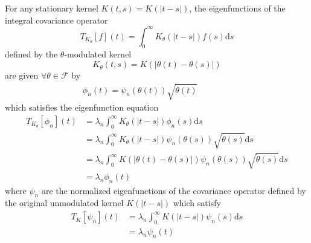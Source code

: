 \documentclass{mc}
\newcommand{\mathd}{\mathrm{d}}
\begin{document}
\begin{theorem}[Eigenfunctions]
  For any stationary kernel $K (t, s) = K (|t - s|)$, the eigenfunctions of
  the integral covariance operator
  \begin{equation}
    T_{K_{\theta}}  [f] (t) = \int_0^{\infty} K_{\theta} (| t - s |) f (s)
    \mathd s
  \end{equation}
  defined by the $\theta$-modulated kernel
  \begin{equation}
    K_{\theta} (t, s) = K (| \theta (t) - \theta (s) |)
  \end{equation}
  are given $\forall \theta \in \mathcal{F}$ by
  \begin{equation}
    \begin{array}{llllll}
      \phi_n (t) = \psi_n (\theta (t)) \sqrt{\dot{\theta} (t)} &  &  &  &  & 
    \end{array}
  \end{equation}
  which satisfies the eigenfunction equation
  \begin{equation}
    \begin{array}{ll}
      T_{K_{\theta}} [\phi_n] (t) & = \lambda_n \int_0^{\infty} K_{\theta} (|
      t - s |) \phi_n (s) \mathd s\\
      & = \lambda_n \int_0^{\infty} K_{\theta} (| t - s |) \psi_n (\theta
      (s)) \sqrt{\dot{\theta} (s)} \mathd s\\
      & = \lambda_n \int_0^{\infty} K (| \theta (t) - \theta (s) |) \psi_n
      (\theta (s)) \sqrt{\dot{\theta} (s)} \mathd s\\
      & = \lambda_n \phi_n (t)
    \end{array}
  \end{equation}
  where $\psi_n$ are the normalized eigenfunctions of the covariance operator defined by the original unmodulated
  kernel $K (|t - s|)$ which satisfy
  \begin{equation}
    \begin{array}{ll}
      T_K [\psi_n] (t) & = \lambda_n \int_0^{\infty} K  (| t - s |) \psi_n (s)
      \mathd s\\
      & = \lambda_n \psi_n (t)
    \end{array}
  \end{equation}
\end{theorem}
\end{document}
